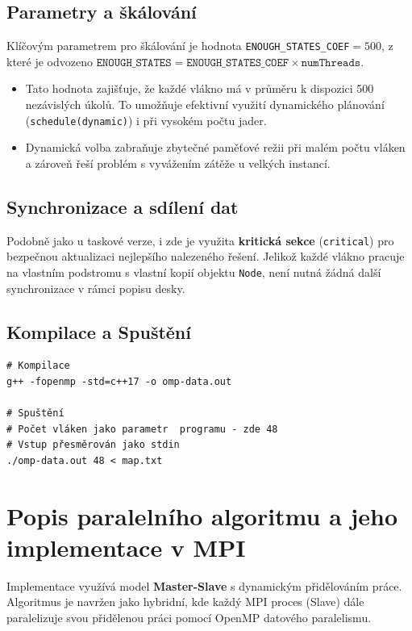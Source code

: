\documentclass[11pt,a4paper]{article}
\begin{document}
\subsection{Parametry a škálování}
Klíčovým parametrem pro škálování je hodnota \texttt{ENOUGH\_STATES\_COEF}$ = 500$, z které je odvozeno $\texttt{ENOUGH\_STATES} = \texttt{ENOUGH\_STATES\_COEF} \times \texttt{numThreads}$.
\begin{itemize}
    \item Tato hodnota zajišťuje, že každé vlákno má v průměru k dispozici 500 nezávislých úkolů. To umožňuje efektivní využití dynamického plánování (\texttt{schedule(dynamic)}) i při vysokém počtu jader.
    \item Dynamická volba zabraňuje zbytečné paměťové režii při malém počtu vláken a zároveň řeší problém s vyvážením zátěže u velkých instancí.
\end{itemize}

\subsection{Synchronizace a sdílení dat}
Podobně jako u taskové verze, i zde je využita \textbf{kritická sekce} (\texttt{critical}) pro bezpečnou aktualizaci nejlepšího nalezeného řešení. Jelikož každé vlákno pracuje na vlastním podstromu s vlastní kopií objektu \texttt{Node}, není nutná žádná další synchronizace v rámci popisu desky.

\subsection{Kompilace a Spuštění}

\begin{verbatim}
# Kompilace
g++ -fopenmp -std=c++17 -o omp-data.out

# Spuštění
# Počet vláken jako parametr  programu - zde 48
# Vstup přesměrován jako stdin
./omp-data.out 48 < map.txt
\end{verbatim}


\section{Popis paralelního algoritmu a jeho implementace v MPI}

Implementace využívá model \textbf{Master-Slave} s dynamickým přidělováním práce. Algoritmus je navržen jako hybridní, kde každý MPI proces (Slave) dále paralelizuje svou přidělenou práci pomocí OpenMP datového paralelismu.
\end{document}
